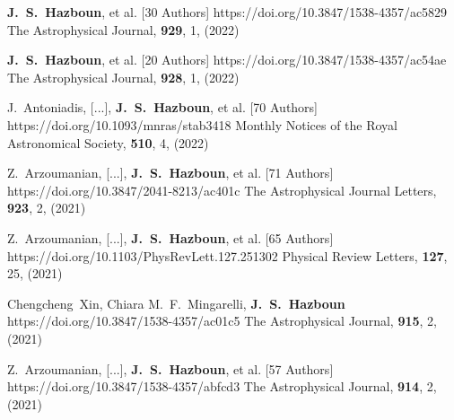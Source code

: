          {\textbf{J.~S.~{Hazboun}}, et al. [30 Authors]}
         {https://doi.org/10.3847/1538-4357/ac5829}
         {{The Astrophysical Journal}, \textbf{929}, 1, (2022)}

         {\textbf{J.~S.~{Hazboun}}, et al. [20 Authors]}
         {https://doi.org/10.3847/1538-4357/ac54ae}
         {{The Astrophysical Journal}, \textbf{928}, 1, (2022)}

         {J.~{Antoniadis}, [...], \textbf{J.~S.~{Hazboun}}, et al. [70 Authors]}
         {https://doi.org/10.1093/mnras/stab3418}
         {{Monthly Notices of the Royal Astronomical Society}, \textbf{510}, 4, (2022)}

         {Z.~{Arzoumanian}, [...], \textbf{J.~S.~{Hazboun}}, et al. [71 Authors]}
         {https://doi.org/10.3847/2041-8213/ac401c}
         {{The Astrophysical Journal Letters}, \textbf{923}, 2, (2021)}

         {Z.~{Arzoumanian}, [...], \textbf{J.~S.~{Hazboun}}, et al. [65 Authors]}
         {https://doi.org/10.1103/PhysRevLett.127.251302}
         {{Physical Review Letters}, \textbf{127}, 25, (2021)}

         {Chengcheng~{Xin}, Chiara M.~F.~{Mingarelli}, \textbf{J.~S.~Hazboun}}
         {https://doi.org/10.3847/1538-4357/ac01c5}
         {{The Astrophysical Journal}, \textbf{915}, 2, (2021)}

         {Z.~{Arzoumanian}, [...], \textbf{J.~S.~{Hazboun}}, et al. [57 Authors]}
         {https://doi.org/10.3847/1538-4357/abfcd3}
         {{The Astrophysical Journal}, \textbf{914}, 2, (2021)}

